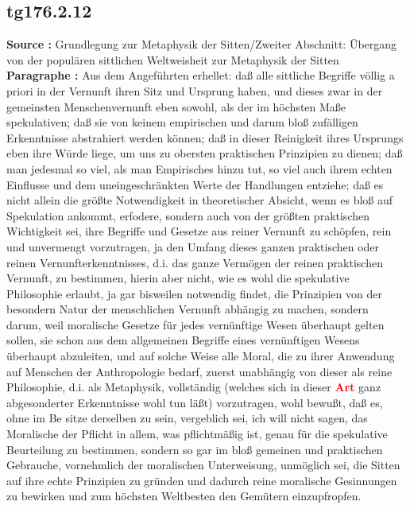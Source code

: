 \documentclass[a4paper,12pt,twoside]{book}
\newcommand{\match}[1]{\textcolor{red}{\textbf{#1}}}
\begin{document}
	\subsection*{tg176.2.12} 
	\textbf{Source : }Grundlegung zur Metaphysik der Sitten/Zweiter Abschnitt: Übergang von der populären sittlichen Weltweisheit zur Metaphysik der Sitten\\  
	
	\noindent\textbf{Paragraphe : }Aus dem Angeführten erhellet: daß alle sittliche Begriffe völlig a priori in der Vernunft ihren Sitz und Ursprung haben, und dieses zwar in der gemeinsten Menschenvernunft eben sowohl, als der im höchsten Maße spekulativen; daß sie von keinem empirischen und darum bloß zufälligen Erkenntnisse  abstrahiert werden können; daß in dieser Reinigkeit ihres Ursprungs eben ihre Würde liege, um uns zu obersten praktischen Prinzipien zu dienen; daß man jedesmal so viel, als man Empirisches hinzu tut, so viel auch ihrem echten Einflusse und dem uneingeschränkten Werte der Handlungen entziehe; daß es nicht allein die größte Notwendigkeit in theoretischer Absicht, wenn es bloß auf Spekulation ankommt, erfodere, sondern auch von der größten praktischen Wichtigkeit sei, ihre Begriffe und Gesetze aus reiner Vernunft zu schöpfen, rein und unvermengt vorzutragen, ja den Umfang dieses ganzen praktischen oder reinen Vernunfterkenntnisses, d.i. das ganze Vermögen der reinen praktischen Vernunft, zu bestimmen, hierin aber nicht, wie es wohl die spekulative Philosophie erlaubt, ja gar bisweilen notwendig findet, die Prinzipien von der besondern Natur der menschlichen Vernunft abhängig zu machen, sondern darum, weil moralische Gesetze für jedes vernünftige Wesen überhaupt gelten sollen, sie schon aus dem allgemeinen Begriffe eines vernünftigen Wesens überhaupt abzuleiten, und auf solche Weise alle Moral, die zu ihrer Anwendung auf Menschen der Anthropologie bedarf, zuerst unabhängig von dieser als reine Philosophie, d.i. als Metaphysik, vollständig (welches sich in dieser \match{Art} ganz abgesonderter Erkenntnisse wohl tun läßt) vorzutragen, wohl bewußt, daß es, ohne im Be sitze derselben zu sein, vergeblich sei, ich will nicht sagen, das Moralische der Pflicht in allem, was pflichtmäßig ist, genau für die spekulative Beurteilung zu bestimmen, sondern so gar im bloß gemeinen und praktischen Gebrauche, vornehmlich der moralischen Unterweisung, unmöglich sei, die Sitten auf ihre echte Prinzipien zu gründen und dadurch reine moralische Gesinnungen zu bewirken und zum höchsten Weltbesten den Gemütern einzupfropfen. 
	
\end{document}
